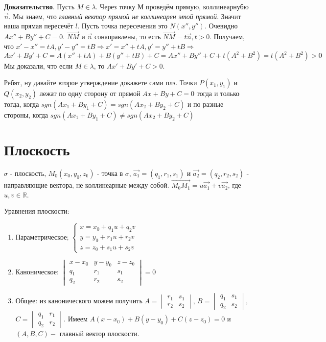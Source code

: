 \documentclass[a4paper]{article}
\begin{document}
\textbf{Доказательство}. Пусть $M \in \lambda$. Через точку М проведём прямую, коллинеарнубю $\vec{n}$. Мы знаем, что \textit{главный вектор прямой не коллинеарен этой прямой}. Значит наша прямая пересечёт $l$. Пусть точка пересечения это $N(x'', y'')$. Очевидно $Ax'' + By'' + C = 0$. $\overrightarrow{NM}$ и $\vec{n}$ сонаправлены, то есть $\overrightarrow{NM} = t \vec{n}, t>0$. Получаем, что $x' -x'' = tA, y'-y'' = tB \Rightarrow x' = x'' + tA, y' = y'' + tB \Rightarrow$ \newline \begin{equation}
Ax' + By' + C = A(x'' + tA) + B(y'' + tB) + C = Ax'' + By'' + C + t(A^2 + B^2) = t(A^2+B^2)>0
\end{equation}
Мы доказали, что если $M \in \lambda$, то $Ax' + By' + C > 0$. 

Ребят, ну давайте второе утверждение докажете сами плз.
\newline
Точки $P(x_1, y_1)$ и $Q(x_2, y_2)$ лежат по одну сторону от прямой $Ax+By+C=0$ тогда и только тогда, когда $sgn (Ax_1+By_1+C) = sgn (Ax_2+By_2+C)$ и по разные стороны, когда $sgn (Ax_1+By_1+C) \neq sgn (Ax_2+By_2+C)$



\section*{Плоскость}

$\sigma$ - плоскость, $M_0(x_0, y_0, z_0)$ - точка в $\sigma$, $\vec{a_1} = (q_1, r_1, s_1)$ и $\vec{a_2} = (q_2, r_2, s_2)$ - направляющие вектора, не коллинеарные между собой.
$\overrightarrow{M_0M_1} = u\vec{a_1} + v\vec{a_2}$, где $u, v \in \mathbb{R}$.


Уравнения плоскости: \begin{enumerate}
\item Параметрическое; $
\begin{cases}
   x = x_0 + q_1u + q_2v 
   \\
   y = y_0 + r_1u + r_2v
   \\
   z = z_0 + s_1u + s_2v  
 \end{cases}
$
\item Каноническое: $\begin{vmatrix}
	x-x_0& y-y_0& z-z_0\\
	q_1& r_1& s_1\\
	q_2& r_2& s_2
\end{vmatrix} = 0$

\item Общее: из канонического можем получить $A = \begin{vmatrix}
	r_1& s_1\\
	r_2&s_2
\end{vmatrix}$, $B = \begin{vmatrix}
	q_1& s_1\\
	q_2&s_2
\end{vmatrix}$, $C = \begin{vmatrix}
	q_1& r_1\\
	q_2&r_2
\end{vmatrix}$. Имеем $A(x-x_0)+B(y-y_0)+C(z-z_0) = 0$ и $(A,B,C) -$  главный	 вектор плоскости.
\end{enumerate}
\end{document}
